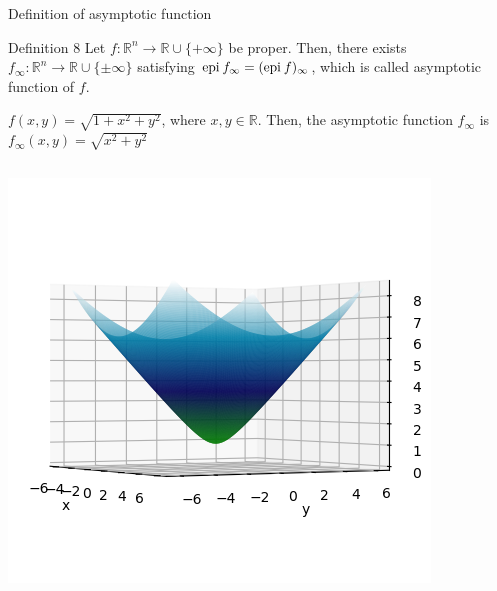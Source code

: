 \documentclass[aspectratio=169, dvipdfmx, 11pt]{beamer}
\newcommand{\RealNumberSet}{\mathbb{R}}
\newcommand{\NDemenstionalRealEuclideanSpace}{\mathbb{R}^n}
\newcommand{\Epigraph}[1]{\text{\rm epi\:${#1}$}} %
\begin{document}
\begin{frame}{Definition of asymptotic function}
  \begin{block}{Definition 8}
    Let $f: \NDemenstionalRealEuclideanSpace \rightarrow \RealNumberSet \cup \{+\infty\}$ be proper. Then, there exists $f_{\infty}: \NDemenstionalRealEuclideanSpace \rightarrow \RealNumberSet \cup \{\pm\infty\}$ satisfying $\Epigraph{f_{\infty}} = (\Epigraph{f})_{\infty}$, which is called asymptotic function of $f$.
  \end{block}

  \begin{example}
    $f(x,y) = \sqrt{1+x^2+y^2}$, where $x,y \in \RealNumberSet$. Then, the asymptotic function $f_{\infty}$ is $f_{\infty}(x,y) = \sqrt{x^2+y^2}$
    \centering
    \begin{columns}
      \pause
      \begin{column}{0.48\textwidth}
      \centering
      \includegraphics[keepaspectratio, scale=0.5]{figures/asymptotic_function_example/asymptotic_function_example_1.png}
      \end{column}
      \pause
      \begin{column}{0.48\textwidth}
      \centering

\end{column}
\end{columns}
\end{example}
\end{frame}
\end{document}

